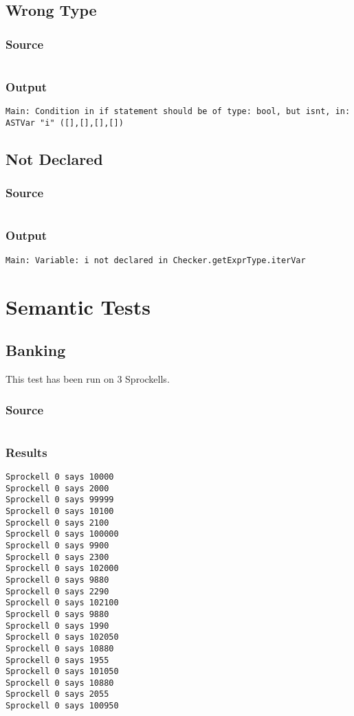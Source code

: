 \documentclass[twoside]{report}
\begin{document}
\section{Wrong Type}
\subsection{Source}
\inputminted[tabsize=4,linenos,firstnumber=1]{text}{../../src/haskell/PP-project-2017/test/wrong_type.shl}
\subsection{Output}
\begin{verbatim}
Main: Condition in if statement should be of type: bool, but isnt, in: ASTVar "i" ([],[],[],[])
\end{verbatim}

\section{Not Declared}
\subsection{Source}
\inputminted[tabsize=4,linenos,firstnumber=1]{text}{../../src/haskell/PP-project-2017/test/not_declared.shl}
\subsection{Output}
\begin{verbatim}
Main: Variable: i not declared in Checker.getExprType.iterVar
\end{verbatim}


\chapter{Semantic Tests}

\section{Banking}
This test has been run on 3 Sprockells.
\subsection{Source}
\inputminted[tabsize=4,linenos,firstnumber=1]{text}{../../src/haskell/PP-project-2017/test/banking.shl}
\subsection{Results}
\begin{verbatim}
Sprockell 0 says 10000
Sprockell 0 says 2000
Sprockell 0 says 99999
Sprockell 0 says 10100
Sprockell 0 says 2100
Sprockell 0 says 100000
Sprockell 0 says 9900
Sprockell 0 says 2300
Sprockell 0 says 102000
Sprockell 0 says 9880
Sprockell 0 says 2290
Sprockell 0 says 102100
Sprockell 0 says 9880
Sprockell 0 says 1990
Sprockell 0 says 102050
Sprockell 0 says 10880
Sprockell 0 says 1955
Sprockell 0 says 101050
Sprockell 0 says 10880
Sprockell 0 says 2055
Sprockell 0 says 100950
\end{verbatim}
\end{document}
